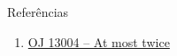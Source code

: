 \begin{frame}[fragile]{Referências}

    \begin{enumerate}
        \item \href{https://onlinejudge.org/index.php?option=com_onlinejudge&Itemid=8&category=24&page=show_problem&problem=4892}{OJ 13004 -- At most twice} 
 
    \end{enumerate}

\end{frame}
